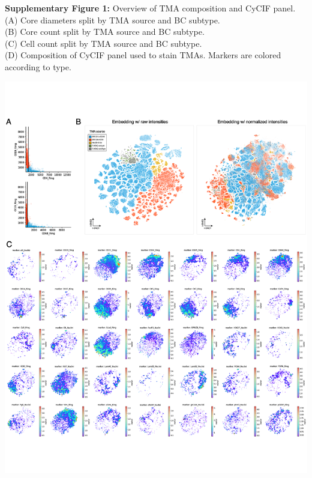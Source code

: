 \documentclass[preprint,review,3p,12pt]{elsarticle}
\begin{document}
\newpage

\noindent
\textbf{Supplementary Figure 1:} Overview of TMA composition and CyCIF panel. \\
(A) Core diameters split by TMA source and BC subtype.\\
(B) Core count split by TMA source and BC subtype.\\
(C) Cell count split by TMA source and BC subtype.\\
(D) Composition of CyCIF panel used to stain TMAs. Markers are colored according to type.

\begin{suppfigure}[p]
\centering\includegraphics[width=\linewidth,
                 keepaspectratio]{suppfig2_secondrevision}
\caption{}
\label{fig:suppfig2}
\end{suppfigure}

\newpage
\end{document}
